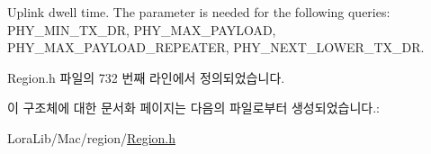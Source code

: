 Uplink dwell time. The parameter is needed for the following queries\+: P\+H\+Y\+\_\+\+M\+I\+N\+\_\+\+T\+X\+\_\+\+DR, P\+H\+Y\+\_\+\+M\+A\+X\+\_\+\+P\+A\+Y\+L\+O\+AD, P\+H\+Y\+\_\+\+M\+A\+X\+\_\+\+P\+A\+Y\+L\+O\+A\+D\+\_\+\+R\+E\+P\+E\+A\+T\+ER, P\+H\+Y\+\_\+\+N\+E\+X\+T\+\_\+\+L\+O\+W\+E\+R\+\_\+\+T\+X\+\_\+\+DR. 

Region.\+h 파일의 732 번째 라인에서 정의되었습니다.



이 구조체에 대한 문서화 페이지는 다음의 파일로부터 생성되었습니다.\+:\begin{DoxyCompactItemize}
\item 
Lora\+Lib/\+Mac/region/\mbox{\hyperlink{_region_8h}{Region.\+h}}\end{DoxyCompactItemize}
